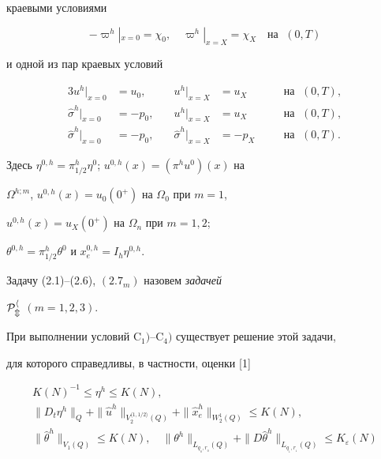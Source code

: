 краевыми условиями


\begin{equation}


-\varpi^h|_{x=0} = \chi_0,\quad \varpi^h|_{x=X} = \chi_X


\quad\text {на }\; (0,T)


\end{equation}


и одной из пар краевых условий


\begin{alignat}{3}


u^h|_{x=0}&=u_0, &\quad


u^h|_{x=X}&=u_X &\quad &\text {на }\; (0,T),\tag{$2.7_1$} \\


\widehat\sigma^h|_{x=0}&=-p_0, &\quad


u^h|_{x=X}&=u_X &\quad &\text {на }\; (0,T),\tag{$2.7_2$} \\


\widehat\sigma^h|_{x=0}&=-p_0, &\quad


\widehat\sigma^h|_{x=X}&=-p_X &\quad &\text {на }\; (0,T).


\tag{$2.7_3$}


\end{alignat}


\addtocounter{equation}{1}


Здесь $\eta^{0,h}=\pi^h_{1/2}\eta^0$; $u^{0,h}(x)=(\pi^hu^0)(x)$ на


$\Omega^{h;m}$, $u^{0,h}(x)=u_0(0^+)$ на $\Omega_0$ при $m=1$,


$u^{0,h}(x)=u_X(0^+)$ на $\Omega_n$ при $m=1,2$;


$\theta^{0,h}=\pi^h_{1/2}\theta^0$ и $x^{0,h}_{e}=I_h\eta^{0,h}$.


Задачу (2.1)--(2.6), $(2.7_m)$ назовем {\it задачей}


$\cal P^h_m$ $(m=1,2,3)$.





При выполнении условий C${}_1)$--C${}_4)$ существует решение этой задачи,


для которого справедливы, в частности, оценки [1]


\begin{gather}


K(N)^{-1}\le\eta^h\le K(N),\\


\|D_t\eta^h\|_Q + \|\widehat u^h\|_{V_2^{\langle1,1/2\rangle}(Q)}+


\|\widehat x_e^h\|_{W_2^1(Q)}\le K(N),\\


\|\widehat\theta^h\|_{V_1(Q)}\le K(N),\quad


\|\theta^h\|_{L_{q_{_0},r_{_0}}(Q)}+


\|D\widehat\theta^h\|_{L_{q_{_1},r_{_1}}(Q)}


\le K_\varepsilon (N)


\end{gather}


